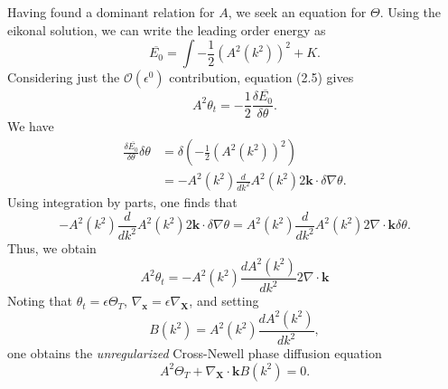 \documentclass[12pt]{article}
\numberwithin{equation}{section}
\begin{document}
\par Having found a dominant relation for $A$, we seek an equation for $\Theta$. Using the eikonal solution, we can write the leading order energy as 
\begin{equation}
    \overline{E_0} = \int - \frac{1}{2}\left( A^2(k^2) \right)^2 + K.
\end{equation}
Considering just the $\mathcal{O}(\epsilon^0)$ contribution, equation (2.5) gives 
\begin{equation}
    A^2 \theta_t = -\frac{1}{2}\frac{\delta \overline{E_0}}{\delta \theta}.
\end{equation}
We have
\begin{align*}
    \frac{\delta \overline{E_0}}{\delta \theta}\delta \theta &= \delta\left( -\frac{1}{2}(A^2(k^2))^2\right)\\
                                                             &= -A^2(k^2)\frac{d}{dk^2}A^2(k^2)2\bm{k}\cdot \delta \nabla \theta.
\end{align*}
Using integration by parts, one finds that
\begin{equation*}
    -A^2(k^2)\frac{d}{dk^2}A^2(k^2)2\bm{k}\cdot \delta \nabla \theta = A^2(k^2)\frac{d}{dk^2}A^2(k^2)2\nabla \cdot \bm{k}\delta \theta.
\end{equation*}
Thus, we obtain
\begin{equation*}
    A^2 \theta_t = -A^2(k^2)\frac{dA^2(k^2)}{dk^2}2\nabla\cdot\bm{k}
\end{equation*}
Noting that $\theta_t = \epsilon \Theta_T$, $\nabla_{\bm{x}}=\epsilon\nabla_{\bm{X}}$, and setting
\begin{equation}
    B(k^2) = A^2(k^2)\frac{dA^2(k^2)}{dk^2},
\end{equation}
one obtains the \emph{unregularized} Cross-Newell phase diffusion equation
\begin{equation}
    A^2\Theta_T + \nabla_{\bm{X}}\cdot \bm{k}B(k^2) = 0.
\end{equation}
\end{document}
